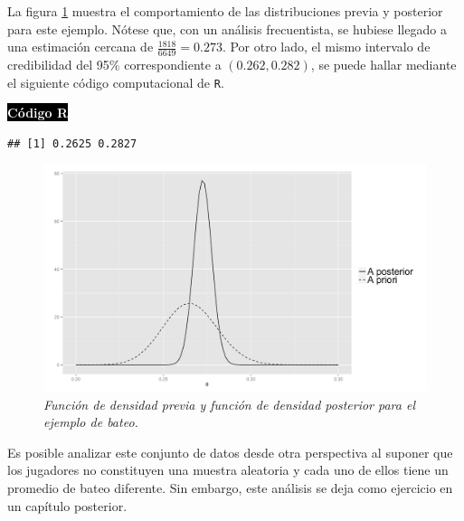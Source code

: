 \begin{Eje}
    La figura \ref{BinomEj1} muestra el comportamiento de las distribuciones previa y posterior para este ejemplo. N\'otese que, con un an\'alisis frecuentista, se hubiese llegado a una estimaci\'on cercana de $\frac{1818}{6649}=0.273$. Por otro lado, el mismo intervalo de credibilidad del 95\% correspondiente a $(0.262, 0.282)$, se puede hallar mediante el siguiente c\'odigo computacional de \texttt{R}.
    
    \colorbox{black}{\textcolor{white}{\textbf{C\'odigo R}}}
\begin{knitrout}
\color{fgcolor}\begin{kframe}
\begin{alltt}
\hlstd{(}\hlstd{(}\hlstd{,} \hlstd{),}\hlstd{,}\hlstd{)}
\end{alltt}
\begin{verbatim}
## [1] 0.2625 0.2827
\end{verbatim}
\end{kframe}
\end{knitrout}
    
    \begin{figure}[!h]
    \centering
    \includegraphics[scale=0.35]{BinomEj1.pdf}
    \caption{\emph{Funci\'on de densidad previa y funci\'on de densidad posterior para el ejemplo de bateo.}}
    \label{BinomEj1}
    \end{figure}
    
    Es posible analizar este conjunto de datos desde otra perspectiva al suponer que los jugadores no constituyen una muestra aleatoria y cada uno de ellos tiene un promedio de bateo diferente. Sin embargo, este an\'alisis se deja como ejercicio en un cap\'itulo posterior.
    \end{Eje}
    
